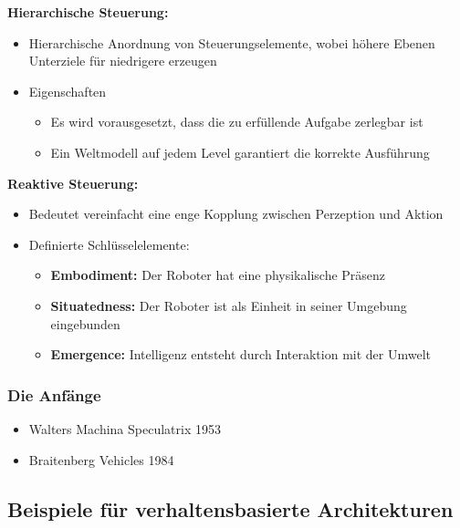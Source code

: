 \textbf{Hierarchische Steuerung:}
\begin{itemize}
	\item Hierarchische Anordnung von Steuerungselemente, wobei höhere Ebenen Unterziele für niedrigere erzeugen
	\item Eigenschaften
	\begin{itemize}
		\item Es wird vorausgesetzt, dass die zu erfüllende Aufgabe zerlegbar ist
		\item Ein Weltmodell auf jedem Level garantiert die korrekte Ausführung
	\end{itemize}
\end{itemize}

\textbf{Reaktive Steuerung:}
\begin{itemize}
	\item Bedeutet vereinfacht eine enge Kopplung zwischen Perzeption und Aktion
	\item Definierte Schlüsselelemente:
	\begin{itemize}
		\item \textbf{Embodiment:} Der Roboter hat eine physikalische Präsenz
		\item \textbf{Situatedness:} Der Roboter ist als Einheit in seiner Umgebung eingebunden
		\item \textbf{Emergence:} Intelligenz entsteht durch Interaktion mit der Umwelt
	\end{itemize}
\end{itemize}

\subsubsection{Die Anfänge}
\begin{itemize}
	\item Walters Machina Speculatrix 1953
	\item Braitenberg Vehicles 1984
\end{itemize}

\subsection{Beispiele für verhaltensbasierte Architekturen}

